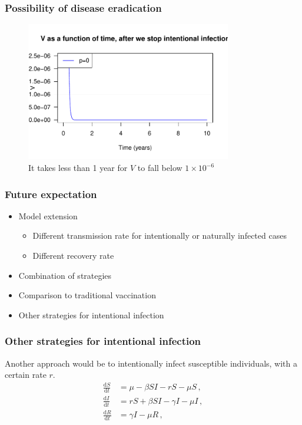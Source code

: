 \documentclass[12pt]{beamer}
\newcommand\dbyd[2]{\frac{\mathrm d{#1}}{\mathrm d{#2}}}
\begin{document}
\begin{frame}
\frametitle{Possibility of disease eradication}
\begin{figure}[H]
  \centering
  \includegraphics[width=0.8\textwidth]{Figures/V_after_stop.pdf}
  \caption{It takes less than 1 year for $V$ to fall below $1\times10^{-6}$}
\end{figure}
\end{frame}
\begin{frame}
\frametitle{Future expectation}
\begin{itemize}\itemsep10pt
\item Model extension
\pause
\begin{itemize}\itemsep10pt
\item Different transmission rate for intentionally or naturally infected cases
\pause
\item Different recovery rate
\end{itemize}
\pause
\item Combination of strategies
\pause
\item Comparison to traditional vaccination
\pause
\item Other strategies for intentional infection
\end{itemize}
\end{frame}
\begin{frame}
\frametitle{Other strategies for intentional infection}

Another approach would be to intentionally infect susceptible individuals, with a certain rate $r$.
\pause
\begin{equation}
\begin{split}
\dbyd{S}{t}&=\mu- \beta SI-rS-\mu S\,, \\
\dbyd{I}{t}&=rS+\beta SI-\gamma I -\mu I\,,\\
\dbyd{R}{t}&=\gamma I-\mu R\,,
\end{split}
\end{equation}
\end{frame}
\end{document}
